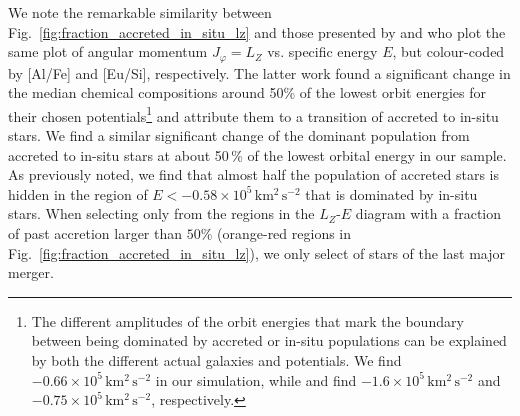 \documentclass[fleqn,usenatbib]{mnras}
\begin{document}
We note the remarkable similarity between Fig.~\ref{fig:fraction_accreted_in_situ_lz} and those presented by \citet[][their Fig.~1]{Belokurov2022} and \citet[][their Fig.~1]{Monty2024} who plot the same plot of angular momentum $J_\varphi = L_Z$ vs. specific energy $E$, but colour-coded by [Al/Fe] and [Eu/Si], respectively. The latter work found a significant change in the median chemical compositions around 50\% of the lowest orbit energies for their chosen potentials\footnote{The different amplitudes of the orbit energies that mark the boundary between being dominated by accreted or in-situ populations can be explained by both the different actual galaxies and potentials. We find $-0.66 \times 10^5\,\mathrm{km^2\,s^{-2}}$ in our simulation, while \citet{Monty2024} and \citet{Belokurov2022} find $-1.6 \times 10^5\,\mathrm{km^2\,s^{-2}}$ and $-0.75 \times 10^5\,\mathrm{km^2\,s^{-2}}$, respectively.} and attribute them to a transition of accreted to in-situ stars. We find a similar significant change of the dominant population from accreted to in-situ stars at about 50\,\% of the lowest orbital energy in our sample. As previously noted, we find that almost half the population of accreted stars is hidden in the region of $E < -0.58\times10^5\,\mathrm{km^2\,s^{-2}}$ that is dominated by in-situ stars. When selecting only from the regions in the $L_Z$-$E$ diagram with a fraction of past accretion larger than $50\mathrm{\%}$ (orange-red regions in Fig.~\ref{fig:fraction_accreted_in_situ_lz}), we only select  of stars of the last major merger.
\end{document}
